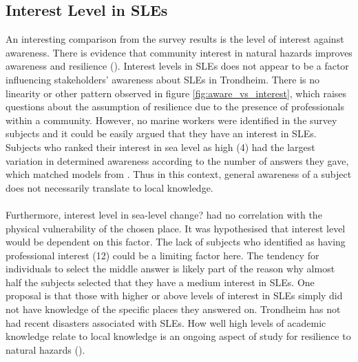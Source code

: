 \subsection{Interest Level in SLEs}
 An interesting comparison from the survey results is the level of interest against awareness. There is evidence that community interest in natural hazards improves awareness and resilience (\cite{cutter_community_2020}). Interest levels in SLEs does not appear to be a factor influencing stakeholders' awareness about SLEs in Trondheim. There is no linearity or other pattern observed in figure \ref{fig:aware_vs_interest}, which raises questions about the assumption of resilience due to the presence of professionals within a community. However, no marine workers were identified in the survey subjects and it could be easily argued that they have an interest in SLEs. Subjects who ranked their interest in sea level as high (4) had the largest variation in determined awareness according to the number of answers they gave, which matched models from \cite{kartverket_se_2021}. Thus in this context, general awareness of a subject does not necessarily translate to local knowledge.
\paragraph{}
Furthermore, interest level in sea-level change? had no correlation with the physical vulnerability of the chosen place. It was hypothesised that interest level would be dependent on this factor. The lack of subjects who identified as having professional interest (12) could be a limiting factor here. The tendency for individuals to select the middle answer is likely part of the reason why almost half the subjects selected that they have a medium interest in SLEs. One proposal is that those with higher or above levels of interest in SLEs simply did not have knowledge of the specific places they answered on. Trondheim has not had recent disasters associated with SLEs. How well high levels of academic knowledge relate to local knowledge is an ongoing aspect of study for resilience to natural hazards (\cite{lujala_role_2020}).
\paragraph{}



   

